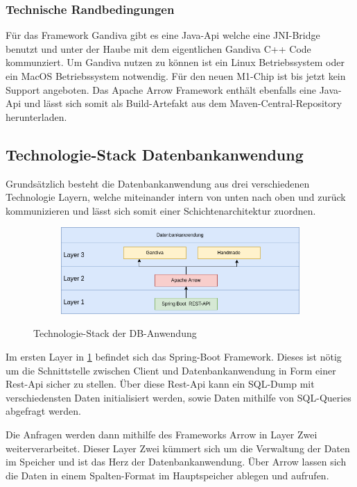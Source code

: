\subsubsection{Technische Randbedingungen}
Für das Framework Gandiva gibt es eine Java-Api welche eine JNI-Bridge benutzt und unter der Haube mit dem eigentlichen Gandiva C++ Code kommunziert.
Um Gandiva nutzen zu können ist ein Linux Betriebssystem oder ein MacOS Betriebssystem notwendig. Für den neuen M1-Chip ist bis jetzt kein Support angeboten.
Das Apache Arrow Framework enthält ebenfalls eine Java-Api und lässt sich somit als Build-Artefakt aus dem Maven-Central-Repository herunterladen.


\subsection{Technologie-Stack Datenbankanwendung}

Grundsätzlich besteht die Datenbankanwendung aus drei verschiedenen Technologie Layern, welche miteinander intern von unten nach oben und zurück kommunizieren und lässt sich somit einer Schichtenarchitektur zuordnen. 


\begin{figure}[h]
  \centering
  \begin{subfigure}[b]{1.0\textwidth}
    \includegraphics[width=1.0\linewidth]{img/layerarch}
  \end{subfigure}
  \caption{Technologie-Stack der DB-Anwendung}
  \label{graf_1}
\end{figure}

Im ersten Layer in \ref{graf_1} befindet sich das Spring-Boot Framework.
Dieses ist nötig um die Schnittstelle zwischen Client und Datenbankanwendung in Form einer Rest-Api sicher zu stellen. 
Über diese Rest-Api kann ein SQL-Dump mit verschiedensten Daten initialisiert werden, sowie Daten mithilfe von SQL-Queries abgefragt werden.

Die Anfragen werden dann mithilfe des Frameworks Arrow in Layer Zwei weiterverarbeitet. Dieser Layer Zwei kümmert sich um die Verwaltung der Daten im Speicher und ist das Herz der Datenbankanwendung. Über Arrow lassen sich die Daten in einem Spalten-Format im Hauptspeicher ablegen und aufrufen.

